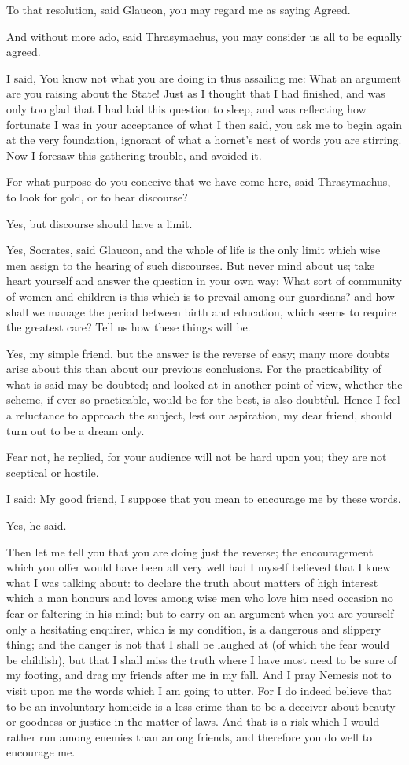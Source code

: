 To that resolution, said Glaucon, you may regard me as saying Agreed.

And without more ado, said Thrasymachus, you may consider us all to be
equally agreed.

I said, You know not what you are doing in thus assailing me: What an
argument are you raising about the State! Just as I thought that I had
finished, and was only too glad that I had laid this question to sleep,
and was reflecting how fortunate I was in your acceptance of what I then
said, you ask me to begin again at the very foundation, ignorant of what
a hornet's nest of words you are stirring. Now I foresaw this gathering
trouble, and avoided it.

For what purpose do you conceive that we have come here, said
Thrasymachus,--to look for gold, or to hear discourse?

Yes, but discourse should have a limit.

Yes, Socrates, said Glaucon, and the whole of life is the only limit
which wise men assign to the hearing of such discourses. But never mind
about us; take heart yourself and answer the question in your own way:
What sort of community of women and children is this which is to prevail
among our guardians? and how shall we manage the period between birth
and education, which seems to require the greatest care? Tell us how
these things will be.

Yes, my simple friend, but the answer is the reverse of easy; many more
doubts arise about this than about our previous conclusions. For the
practicability of what is said may be doubted; and looked at in another
point of view, whether the scheme, if ever so practicable, would be for
the best, is also doubtful. Hence I feel a reluctance to approach the
subject, lest our aspiration, my dear friend, should turn out to be a
dream only.

Fear not, he replied, for your audience will not be hard upon you; they
are not sceptical or hostile.

I said: My good friend, I suppose that you mean to encourage me by these
words.

Yes, he said.

Then let me tell you that you are doing just the reverse; the
encouragement which you offer would have been all very well had I myself
believed that I knew what I was talking about: to declare the truth
about matters of high interest which a man honours and loves among wise
men who love him need occasion no fear or faltering in his mind; but to
carry on an argument when you are yourself only a hesitating enquirer,
which is my condition, is a dangerous and slippery thing; and the danger
is not that I shall be laughed at (of which the fear would be childish),
but that I shall miss the truth where I have most need to be sure of my
footing, and drag my friends after me in my fall. And I pray Nemesis not
to visit upon me the words which I am going to utter. For I do indeed
believe that to be an involuntary homicide is a less crime than to be a
deceiver about beauty or goodness or justice in the matter of laws.
And that is a risk which I would rather run among enemies than among
friends, and therefore you do well to encourage me.

